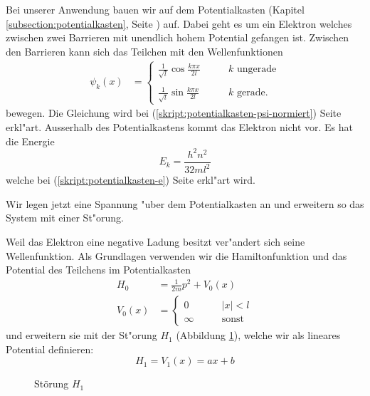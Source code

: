 \begin{refsection}
Bei unserer Anwendung bauen wir auf dem Potentialkasten (Kapitel \ref{subsection:potentialkasten}, Seite \pageref{subsection:potentialkasten}) auf.
Dabei geht es um ein Elektron welches zwischen zwei Barrieren mit unendlich hohem Potential gefangen ist.
Zwischen den Barrieren kann sich das Teilchen mit den Wellenfunktionen
\begin{align}
\psi_k(x)
&=
\begin{cases}
\displaystyle
\frac{1}{\sqrt{l}}\cos\frac{k \pi x}{2l}&\qquad \text{$k$ ungerade}\\
\\
\displaystyle
\frac{1}{\sqrt{l}}\sin\frac{k \pi x}{2l}&\qquad \text{$k$ gerade}.
\end{cases}
\end{align}
bewegen.
Die Gleichung wird bei (\ref{skript:potentialkasten-psi-normiert}) Seite \pageref{skript:potentialkasten-psi-normiert} erkl"art.
Ausserhalb des Potentialkastens kommt das Elektron nicht vor.
Es hat die Energie
\[
E_k = \frac{h^2n^2}{32ml^2}
\]
welche bei (\ref{skript:potentialkasten-e})
Seite \pageref{skript:potentialkasten-e} erkl"art wird.

Wir legen jetzt eine Spannung "uber dem Potentialkasten an
und erweitern so das System mit einer St"orung.

Weil das Elektron eine negative Ladung besitzt ver"andert sich seine Wellenfunktion.
Als Grundlagen verwenden wir die Hamiltonfunktion und das Potential des Teilchens im Potentialkasten
\begin{equation}
\begin{aligned}
H_0&=\frac1{2m}p^2+V_0(x)
\\
V_0(x)&=
  \begin{cases}
    0       & \qquad |x|<l\\
    \infty  & \qquad\text{sonst}
  \end{cases}
\end{aligned}
\end{equation}
und erweitern sie mit der St"orung $H_1$ (Abbildung \ref{abb:efeld_H_1}), welche wir als lineares 
Potential definieren:
\begin{equation}
	\label{eq:efeld_H_1}
  H_1 = V_1(x) = a x + b
\end{equation}

\begin{figure}
  \centering
{}
 \caption{St\"orung $H_1$}
 \label{abb:efeld_H_1}
\end{figure}


\end{refsection}

